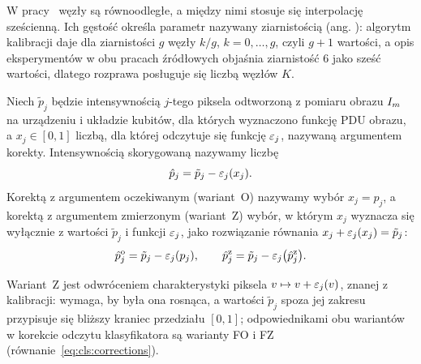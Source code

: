 W pracy~\cite{werner_error_reduction_2025} węzły są równoodległe, a między nimi stosuje się interpolację sześcienną.
Ich gęstość określa parametr nazywany ziarnistością (ang. ): algorytm kalibracji daje dla ziarnistości $g$ węzły $k/g$, $k=0,\dots,g$, czyli $g+1$ wartości, a opis eksperymentów w obu pracach źródłowych objaśnia ziarnistość $6$ jako sześć wartości, dlatego rozprawa posługuje się liczbą węzłów $K$.

\begin{Definition}\label{def:pdui:correction}
Niech $\tilde{p}_j$ będzie intensywnością $j$-tego piksela odtworzoną z pomiaru obrazu $I_m$ na urządzeniu i układzie kubitów, dla których wyznaczono funkcję PDU obrazu, a $x_j\in[0,1]$ liczbą, dla której odczytuje się funkcję $\varepsilon_j$, nazywaną argumentem korekty.
Intensywnością skorygowaną nazywamy liczbę
\begin{equation}\label{eq:pdui:correction}
\hat{p}_j=\tilde{p}_j-\varepsilon_j(x_j).
\end{equation}
Korektą z argumentem oczekiwanym (wariant~O) nazywamy wybór $x_j=p_j$, a korektą z argumentem zmierzonym (wariant~Z) wybór, w którym $x_j$ wyznacza się wyłącznie z wartości $\tilde{p}_j$ i funkcji $\varepsilon_j$, jako rozwiązanie równania $x_j+\varepsilon_j(x_j)=\tilde{p}_j$:
\begin{equation}\label{eq:pdui:variants}
\hat{p}^{\mathrm{o}}_j=\tilde{p}_j-\varepsilon_j(p_j),
\qquad
\hat{p}^{\mathrm{z}}_j=\tilde{p}_j-\varepsilon_j\bigl(\hat{p}^{\mathrm{z}}_j\bigr).
\end{equation}
\end{Definition}

Wariant~Z jest odwróceniem charakterystyki piksela $v\mapsto v+\varepsilon_j(v)$, znanej z kalibracji: wymaga, by była ona rosnąca, a wartości $\tilde{p}_j$ spoza jej zakresu przypisuje się bliższy kraniec przedziału $[0,1]$; odpowiednikami obu wariantów w korekcie odczytu klasyfikatora są warianty FO i FZ (równanie~\eqref{eq:cls:corrections}).

